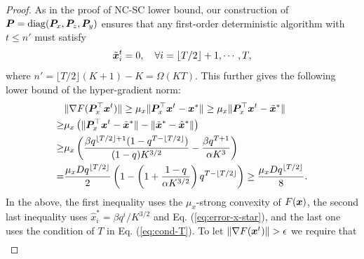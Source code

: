 \begin{proof}
As in the proof of NC-SC lower bound, our construction of ${\bm{P}} = {\rm diag}({\bm{P}}_x, {\bm{P}}_z, {\bm{P}}_y)$ ensures that 
any first-order deterministic algorithm with $t \le n'$ must satisfy
\begin{align*}
    \tilde {{\bm{x}}}^t_i  = 0, \quad \forall i = \lfloor T/2 \rfloor +1, \cdots, T,
\end{align*}
where $n' = \lfloor T/ 2 \rfloor(K+1) -K = \Omega(K T )$. This further gives the following lower bound of the hyper-gradient norm:
\begin{align*}
    & \Vert \nabla F({\bm{P}}_x^\top {\bm{x}}^t) \Vert \ge \mu_x \Vert {\bm{P}}_x^\top {\bm{x}}^t -{\bm{x}}^* \Vert \ge \mu_x \Vert {\bm{P}}_x^\top {\bm{x}}^t -\tilde {{\bm{x}}}^* \Vert \\
    \ge & \mu_x \left( \Vert {\bm{P}}_x^\top {\bm{x}}^t -\tilde {{\bm{x}}}^* \Vert - \Vert \tilde {{\bm{x}}}^* - \hat {{\bm{x}}}^* \Vert \right) \\
    \ge & \mu_x \left(\frac{\beta q^{\lfloor T/2 \rfloor +1} (1 - q^{T - \lfloor T/2 \rfloor})}{(1-q) K^{3/2}} -  \frac{\beta q^{T+1}}{\alpha K^{3}} \right) \\
    = & \frac{\mu_x D q^{\lfloor T/2 \rfloor }}{2}   \left(1 -  \left( 1 + \frac{1-q}{\alpha K^{3/2}} \right) q^{T - \lfloor T/2 \rfloor}  \right) \ge  \frac{\mu_x D q^{\lfloor T/2 \rfloor }}{8}.
\end{align*}
In the above, the first inequality uses the $\mu_x$-strong convexity of $F({\bm{x}})$, the second last inequality uses $\hat x_i^* = \beta q^i / K^{3/2}$ and Eq. (\ref{eq:error-x-star}), and the last one uses the condition of $T$ in Eq. (\ref{eq:cond-T}).
To let $\Vert \nabla F({\bm{x}}^t) \Vert > \epsilon$ we require that 
\begin{align} \label{eq:cond-T-eps}

\end{align}
\end{proof}
